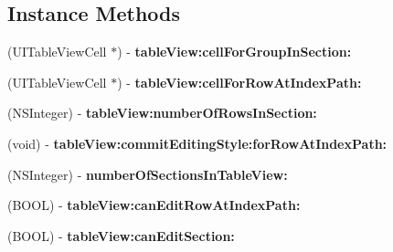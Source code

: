 \subsection*{Instance Methods}
\begin{DoxyCompactItemize}
\item 
\hypertarget{protocol_expandable_table_view_data_source-p_aa0e25cc6f8806cd345d20af5e257ba39}{(U\-I\-Table\-View\-Cell $\ast$) -\/ {\bfseries table\-View\-:cell\-For\-Group\-In\-Section\-:}}\label{protocol_expandable_table_view_data_source-p_aa0e25cc6f8806cd345d20af5e257ba39}

\item 
\hypertarget{protocol_expandable_table_view_data_source-p_ae998a47cefd776c44da39c225a7d2b1e}{(U\-I\-Table\-View\-Cell $\ast$) -\/ {\bfseries table\-View\-:cell\-For\-Row\-At\-Index\-Path\-:}}\label{protocol_expandable_table_view_data_source-p_ae998a47cefd776c44da39c225a7d2b1e}

\item 
\hypertarget{protocol_expandable_table_view_data_source-p_adb703db51e05f526f732827d203c91b4}{(N\-S\-Integer) -\/ {\bfseries table\-View\-:number\-Of\-Rows\-In\-Section\-:}}\label{protocol_expandable_table_view_data_source-p_adb703db51e05f526f732827d203c91b4}

\item 
\hypertarget{protocol_expandable_table_view_data_source-p_a9924b51edc7797ea070e7fa1920566f7}{(void) -\/ {\bfseries table\-View\-:commit\-Editing\-Style\-:for\-Row\-At\-Index\-Path\-:}}\label{protocol_expandable_table_view_data_source-p_a9924b51edc7797ea070e7fa1920566f7}

\item 
\hypertarget{protocol_expandable_table_view_data_source-p_a16344abf23c0ffcf68c4b33b4665d220}{(N\-S\-Integer) -\/ {\bfseries number\-Of\-Sections\-In\-Table\-View\-:}}\label{protocol_expandable_table_view_data_source-p_a16344abf23c0ffcf68c4b33b4665d220}

\item 
\hypertarget{protocol_expandable_table_view_data_source-p_a0c11002eba18683b3e674745e8b00131}{(B\-O\-O\-L) -\/ {\bfseries table\-View\-:can\-Edit\-Row\-At\-Index\-Path\-:}}\label{protocol_expandable_table_view_data_source-p_a0c11002eba18683b3e674745e8b00131}

\item 
\hypertarget{protocol_expandable_table_view_data_source-p_a81d68325ed042a97472f4525affebf63}{(B\-O\-O\-L) -\/ {\bfseries table\-View\-:can\-Edit\-Section\-:}}\label{protocol_expandable_table_view_data_source-p_a81d68325ed042a97472f4525affebf63}


\end{DoxyCompactItemize}
